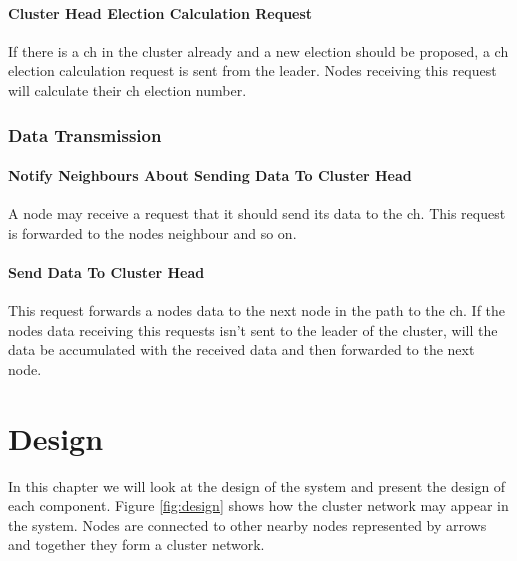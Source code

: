 \documentclass[USenglish]{uit-thesis}
\begin{document}
\subsubsection{Cluster Head Election Calculation Request}
If there is a \gls{ch} in the cluster already and a new election should be proposed, a \gls{ch} election calculation request is sent from the leader. Nodes receiving this request will calculate their \gls{ch} election number. %

\subsection{Data Transmission}
\subsubsection{Notify Neighbours About Sending Data To Cluster Head}
A node may receive a request that it should send its data to the \gls{ch}. This request is forwarded to the nodes neighbour and so on.

\subsubsection{Send Data To Cluster Head}
This request forwards a nodes data to the next node in the path to the \gls{ch}. If the nodes data receiving this requests isn't sent to the leader of the cluster, will the data be accumulated with the received data and then forwarded to the next node.



\chapter{Design}
In this chapter we will look at the design of the system and present the design of each component. Figure \ref{fig:design} shows how the cluster network may appear in the system. Nodes are connected to other nearby nodes represented by arrows and together they form a cluster network.
\end{document}
